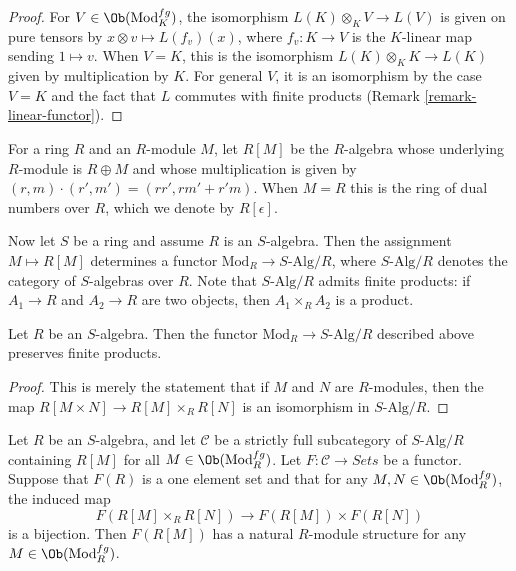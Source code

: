 \begin{proof}
For $V \in \Ob(\text{Mod}^{fg}_K)$, the isomorphism
$L(K) \otimes_K V \to L(V)$ is given on pure tensors by
$x \otimes v \mapsto L(f_v)(x)$, where $f_v: K \to V$ is the $K$-linear map
sending $1 \mapsto v$.  When $V = K$, this is the isomorphism
$L(K) \otimes_K K \to L(K)$ given by multiplication by $K$.
For general $V$, it is an isomorphism by the case $V = K$ and the
fact that $L$ commutes with finite
products (Remark \ref{remark-linear-functor}).
\end{proof}

\noindent
For a ring $R$ and an $R$-module $M$, let $R[M]$ be the $R$-algebra whose
underlying $R$-module is $R \oplus M$ and whose multiplication is given by
$(r, m) \cdot (r', m') = (rr', rm' + r'm)$.  When $M = R$ this is the ring of
dual numbers over $R$, which we denote by $R[\epsilon]$.

\medskip\noindent
Now let $S$ be a ring and assume $R$ is an $S$-algebra.
Then the assignment $M \mapsto R[M]$ determines a functor
$\text{Mod}_R \to S\text{-Alg}/R$, where $S\text{-Alg}/R$
denotes the category of $S$-algebras over $R$. Note that
$S\text{-Alg}/R$ admits finite products: if $A_1 \to R$ and
$A_2 \to R$ are two objects, then $A_1 \times_R A_2$ is a product.

\begin{lemma}
\label{lemma-preserves-products}
Let $R$ be an $S$-algebra. Then the functor
$\text{Mod}_R \to S\text{-Alg}/R$ described above preserves finite products.
\end{lemma}

\begin{proof}
This is merely the statement that if $M$ and $N$ are $R$-modules, then the map
$R[M \times N] \to R[M] \times_R R[N]$ is an isomorphism in
$S\text{-Alg}/R$.
\end{proof}

\begin{lemma}
\label{lemma-tangent-space-functor}
Let $R$ be an $S$-algebra, and let $\mathcal{C}$ be a strictly full
subcategory of $S\text{-Alg}/R$ containing $R[M]$ for all
$M \in \Ob(\text{Mod}^{fg}_R)$.
Let $F: \mathcal{C} \to \textit{Sets}$ be a functor. Suppose that
$F(R)$ is a one element set and that for any $M, N \in
\Ob(\text{Mod}^{fg}_R)$, the induced map
$$
F(R[M] \times_R R[N]) \to F(R[M]) \times F(R[N])
$$
is a bijection. Then $F(R[M])$ has a natural $R$-module structure for any $M
\in \Ob(\text{Mod}^{fg}_R)$.
\end{lemma}

